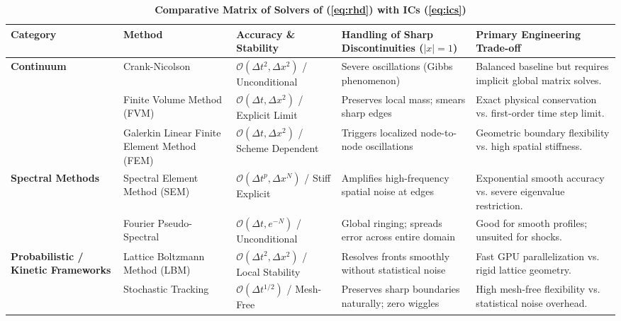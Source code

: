\begin{landscape}
\begin{table}
\centering
\captionsetup{font=large}
\caption*{\textbf{Comparative Matrix of Solvers of (\ref{eq:rhd}) with ICs (\ref{eq:ics})}}
\label{tab:solvers_summary}

\begin{tabular}{|>{\raggedright\arraybackslash}p{3.5cm} |>{\raggedright\arraybackslash}p{4.5cm} |>{\raggedright\arraybackslash}p{3.0cm} |>{\raggedright\arraybackslash}p{5.5cm} |>{\raggedright\arraybackslash}p{6.25cm}|} \toprule
\textbf{Category} & \textbf{Method} & \textbf{Accuracy \& Stability} & \textbf{Handling of Sharp Discontinuities ($|x|=1$)} & \textbf{Primary Engineering Trade-off} \\ \toprule    
\textbf{Continuum} & Crank-Nicolson & $\mathcal{O}(\Delta t^2, \Delta x^2)$ / Unconditional & Severe oscillations (Gibbs phenomenon) & Balanced baseline but requires implicit global matrix solves. \\ \cline{2-5}
& Finite Volume Method (FVM) & $\mathcal{O}(\Delta t, \Delta x^2)$ / Explicit Limit & Preserves local mass; smears sharp edges & Exact physical conservation vs. first-order time step limit. \\ \cline{2-5}
& Galerkin Linear Finite Element Method (FEM) & $\mathcal{O}(\Delta t, \Delta x^2)$ / Scheme Dependent & Triggers localized node-to-node oscillations & Geometric boundary flexibility vs. high spatial stiffness. \\ \toprule

\textbf{Spectral Methods} & Spectral Element Method (SEM) & $\mathcal{O}(\Delta t^p, \Delta x^N)$ / Stiff Explicit & Amplifies high-frequency spatial noise at edges & Exponential smooth accuracy vs. severe eigenvalue restriction. \\ \cline{2-5}
& Fourier Pseudo-Spectral & $\mathcal{O}(\Delta t, e^{-N})$ / Unconditional & Global ringing; spreads error across entire domain & Good for smooth profiles; unsuited for shocks. \\ \toprule

\textbf{Probabilistic / Kinetic Frameworks} & Lattice Boltzmann Method (LBM) & $\mathcal{O}(\Delta t^2, \Delta x^2)$ / Local Stability & Resolves fronts smoothly without statistical noise & Fast GPU parallelization vs. rigid lattice geometry. \\ \cline{2-5}
& Stochastic Tracking & $\mathcal{O}(\Delta t^{1/2})$ / Mesh-Free & Preserves sharp boundaries naturally; zero wiggles & High mesh-free flexibility vs. statistical noise overhead. \\ \toprule


\end{tabular}
\end{table}
\end{landscape}
